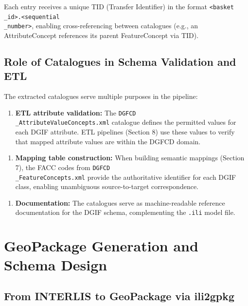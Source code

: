 \documentclass[conference]{IEEEtran}
\begin{document}
Each entry receives a unique TID (Transfer Identifier) in the format \texttt{<basket\\_id>.<sequential\\_number>}, enabling cross-referencing between catalogues (e.g., an AttributeConcept references its parent FeatureConcept via TID).

\subsection{Role of Catalogues in Schema Validation and ETL}

The extracted catalogues serve multiple purposes in the pipeline:

\begin{enumerate}[leftmargin=*]
\item \textbf{ETL attribute validation:} The \texttt{DGFCD\\_AttributeValueConcepts.xml} catalogue defines the permitted values for each DGIF attribute. ETL pipelines (Section 8) use these values to verify that mapped attribute values are within the DGFCD domain.
\end{enumerate}

\begin{enumerate}[leftmargin=*]
\item \textbf{Mapping table construction:} When building semantic mappings (Section 7), the FACC codes from \texttt{DGFCD\\_FeatureConcepts.xml} provide the authoritative identifier for each DGIF class, enabling unambiguous source-to-target correspondence.
\end{enumerate}

\begin{enumerate}[leftmargin=*]
\item \textbf{Documentation:} The catalogues serve as machine-readable reference documentation for the DGIF schema, complementing the \texttt{.ili} model file.
\end{enumerate}



\section{GeoPackage Generation and Schema Design}

\subsection{From INTERLIS to GeoPackage via ili2gpkg}
\end{document}
